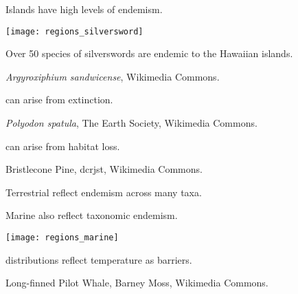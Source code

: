 \documentclass[t]{beamer}
\begin{document}
%
\begin{frame}[t]{Islands have high levels of endemism.}
	\begin{multicols}{2}
	
		\texttt{[image: regions\_silversword]}
	
		\columnbreak
	
		\vspace*{2\baselineskip}	
	
		\noindent Over 50 species of silverswords are endemic to the Hawaiian islands.
		
	\end{multicols}

	\vfilll
	
	\tiny\hfill\textit{Argyroxiphium sandwicense}, Wikimedia Commons.

\end{frame}
%
{
\begin{frame}[b]{ can arise from extinction.}

	\tiny\hfill\textit{Polyodon spatula}, The Earth Society, Wikimedia Commons.
\end{frame}
}
%
{
\begin{frame}[b]{ can arise from habitat loss.}

	\tiny\hfill Bristlecone Pine, dcrjst, Wikimedia Commons.
\end{frame}
}
%
{
\begin{frame}[b]{Terrestrial  reflect endemism across many taxa.}

\end{frame}
}
%
\begin{frame}[t]{Marine  also reflect taxonomic endemism.}

	\texttt{[image: regions\_marine]}

\end{frame}
%
{
\begin{frame}[b]{ distributions reflect temperature as barriers.}

	\tiny\hfill Long-finned Pilot Whale, Barney Moss, Wikimedia Commons.
\end{frame}
}
\end{document}
